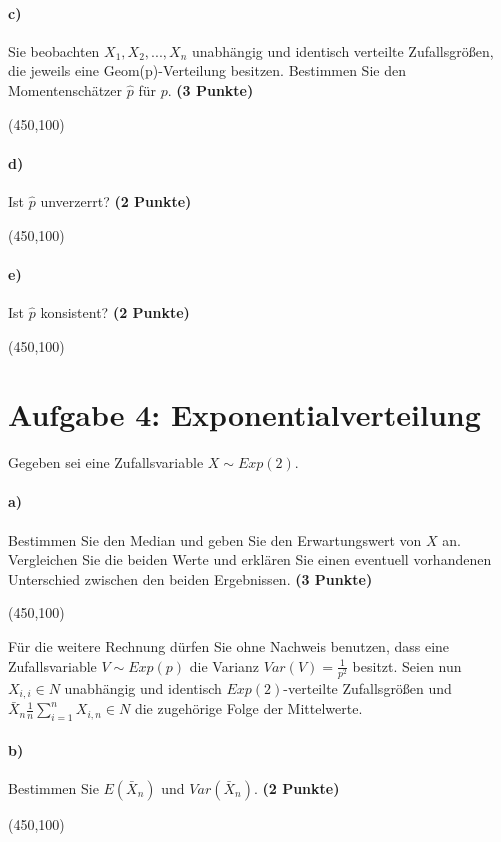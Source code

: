 \documentclass[10pt, a4paper]{article}
\begin{document}
\paragraph{c)} Sie beobachten $X_1,X_2,...,X_n$ unabhängig und identisch verteilte Zufallsgrößen, die jeweils eine Geom(p)-Verteilung besitzen. Bestimmen Sie den Momentenschätzer $\hat{p}$ für $p$. \textbf{(3 Punkte)}
\begin{center}
  \framebox(450,100){}
\end{center}

\paragraph{d)} Ist $\hat{p}$ unverzerrt? \textbf{(2 Punkte)}
\begin{center}
  \framebox(450,100){}
\end{center}

\paragraph{e)} Ist $\hat{p}$ konsistent? \textbf{(2 Punkte)}
\begin{center}
  \framebox(450,100){}
\end{center}

\section{Aufgabe 4: Exponentialverteilung}
Gegeben sei eine Zufallsvariable $X \sim Exp(2)$.
\paragraph{a)} Bestimmen Sie den Median und geben Sie den Erwartungswert von $X$ an. Vergleichen Sie die beiden Werte und erklären Sie einen eventuell vorhandenen Unterschied zwischen den beiden Ergebnissen. \textbf{(3 Punkte)}
\begin{center}
  \framebox(450,100){}
\end{center}

Für die weitere Rechnung dürfen Sie ohne Nachweis benutzen, dass eine Zufallsvariable $V\sim Exp(p)$ die Varianz $Var(V) =\frac{1}{p^2}$ besitzt. Seien nun $X_{i,i}\in N$ unabhängig und identisch $Exp(2)$-verteilte Zufallsgrößen und $\bar{X}_n \frac{1}{n}\sum_{i=1}^{n} X_{i,n}\in N$ die zugehörige Folge der Mittelwerte.
\paragraph{b)} Bestimmen Sie $E(\bar{X}_n)$ und $Var(\bar{X}_n)$. \textbf{(2 Punkte)}
\begin{center}
  \framebox(450,100){}
\end{center}
\end{document}
